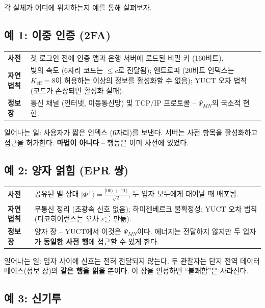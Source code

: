\documentclass[12pt,a4paper]{article}
\begin{document}
	각 실체가 어디에 위치하는지 예를 통해 살펴보자.
	
	\subsection{예 1: 이중 인증 (2FA)}
	
	\begin{tabular}{p{2.8cm} p{10cm}}
		\textbf{사전} & 첫 로그인 전에 인증 앱과 은행 서버에 로드된 비밀 키 (160비트). \\
		\textbf{자연 법칙} & 빛의 속도 (6자리 코드는 \(\le c\)로 전달됨); 엔트로피 (20비트 인덱스는 \(K_{\mathrm{eff}}=8\)이 허용하는 이상의 정보를 활성화할 수 없음); YUCT 오차 법칙 (코드가 손상되면 활성화 실패). \\
		\textbf{정보 장} & 통신 채널 (인터넷, 이동통신망) 및 TCP/IP 프로토콜 – \(\Psi_{MN}\)의 국소적 현현. \\
	\end{tabular}
	
	\noindent 일어나는 일: 사용자가 짧은 인덱스 (6자리)를 보낸다. 서버는 사전 항목을 활성화하고 접근을 허가한다. \textbf{마법이 아니다} – 행동은 이미 사전에 있었다.
	
	\subsection{예 2: 양자 얽힘 (EPR 쌍)}
	
	\begin{tabular}{p{2.8cm} p{10cm}}
		\textbf{사전} & 공유된 벨 상태 \(|\Phi^+\rangle = \frac{|00\rangle + |11\rangle}{\sqrt{2}}\), 두 입자 모두에게 태어날 때 배포됨. \\
		\textbf{자연 법칙} & 무통신 정리 (초광속 신호 없음); 하이젠베르크 불확정성; YUCT 오차 법칙 (디코히어런스는 오차 \(\varepsilon\)를 만듦). \\
		\textbf{정보 장} & 양자 장 – YUCT에서 이것은 \(\Psi_{MN}\)이다. 에너지는 전달하지 않지만 두 입자가 \textbf{동일한 사전 행}에 접근할 수 있게 한다. \\
	\end{tabular}
	
	\noindent 일어나는 일: 입자 사이에 신호는 전혀 전달되지 않는다. 두 관찰자는 단지 전역 데이터베이스(정보 장)의 \textbf{같은 행을 읽을} 뿐이다. 이 장을 인정하면 “불쾌함”은 사라진다.
	
	\subsection{예 3: 신기루}
	
\end{document}
